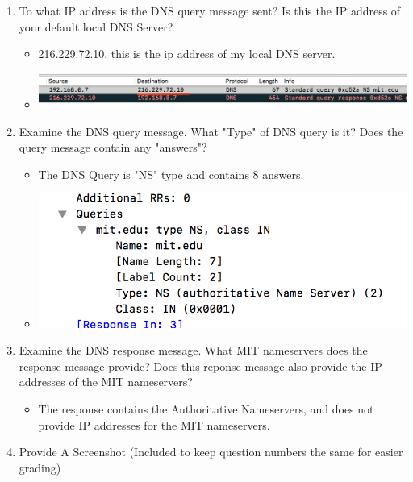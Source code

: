 \documentclass{article}
\begin{document}
\begin{itemize}
\begin{enumerate}
      \item To what IP address is the DNS query message sent? Is this the IP address of your default local DNS Server?
      \begin{itemize}
        \item 216.229.72.10, this is the ip address of my local DNS server.
        \item \includegraphics[scale=0.5]{images/DNS16.png}
      \end{itemize}
      \item Examine the DNS query message.  What "Type" of DNS query is it?  Does the query message contain any "answers"?
      \begin{itemize}
        \item The DNS Query is "NS" type and contains 8 answers.
        \item \includegraphics[scale=0.5]{images/DNS17.png}
      \end{itemize}
      \item Examine the DNS response message.  What MIT nameservers does the response message provide?  Does this reponse message also provide the IP addresses of the MIT nameservers?
      \begin{itemize}
        \item The response contains the Authoritative Nameservers, and does not provide IP addresses for the MIT nameservers.
        
      \end{itemize}
      \item Provide A Screenshot (Included to keep question numbers the same for easier grading)
      

\end{enumerate}
\end{itemize}
\end{document}
